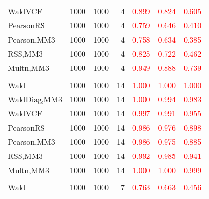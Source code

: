\documentclass[
]{article}
\begin{document}
\begin{table}[H]
{\begin{tabular}[t]{lrrrrrr}
\hspace{1em}WaldVCF & 1000 & 1000 & 4 & \textcolor{red}{0.899} & \textcolor{red}{0.824} & \textcolor{red}{0.605}\\
\hspace{1em}PearsonRS & 1000 & 1000 & 4 & \textcolor{red}{0.759} & \textcolor{red}{0.646} & \textcolor{red}{0.410}\\
\hspace{1em}Pearson,MM3 & 1000 & 1000 & 4 & \textcolor{red}{0.758} & \textcolor{red}{0.634} & \textcolor{red}{0.385}\\
\hspace{1em}RSS,MM3 & 1000 & 1000 & 4 & \textcolor{red}{0.825} & \textcolor{red}{0.722} & \textcolor{red}{0.462}\\
\hspace{1em}Multn,MM3 & 1000 & 1000 & 4 & \textcolor{red}{0.949} & \textcolor{red}{0.888} & \textcolor{red}{0.739}\\
\addlinespace[0.3em]
\multicolumn{7}{l}{\textbf{1F 15V}}\\
\hspace{1em}Wald & 1000 & 1000 & 14 & \textcolor{red}{1.000} & \textcolor{red}{1.000} & \textcolor{red}{1.000}\\
\hspace{1em}WaldDiag,MM3 & 1000 & 1000 & 14 & \textcolor{red}{1.000} & \textcolor{red}{0.994} & \textcolor{red}{0.983}\\
\hspace{1em}WaldVCF & 1000 & 1000 & 14 & \textcolor{red}{0.997} & \textcolor{red}{0.991} & \textcolor{red}{0.955}\\
\hspace{1em}PearsonRS & 1000 & 1000 & 14 & \textcolor{red}{0.986} & \textcolor{red}{0.976} & \textcolor{red}{0.898}\\
\hspace{1em}Pearson,MM3 & 1000 & 1000 & 14 & \textcolor{red}{0.986} & \textcolor{red}{0.975} & \textcolor{red}{0.885}\\
\hspace{1em}RSS,MM3 & 1000 & 1000 & 14 & \textcolor{red}{0.992} & \textcolor{red}{0.985} & \textcolor{red}{0.941}\\
\hspace{1em}Multn,MM3 & 1000 & 1000 & 14 & \textcolor{red}{1.000} & \textcolor{red}{1.000} & \textcolor{red}{0.999}\\
\addlinespace[0.3em]
\multicolumn{7}{l}{\textbf{2F 10V}}\\
\hspace{1em}Wald & 1000 & 1000 & 7 & \textcolor{red}{0.763} & \textcolor{red}{0.663} & \textcolor{red}{0.456}\\

\end{tabular}}
\end{table}
\end{document}
